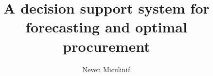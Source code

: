 \documentclass[times, utf8, zavrsni]{fer}
\begin{document}
\theoremstyle{definition}
\newtheorem{definition}{Definition}[section]

\title{A decision support system for forecasting and optimal procurement}
\author{Neven Miculinić}

\maketitle

\tableofcontents










\end{document}
